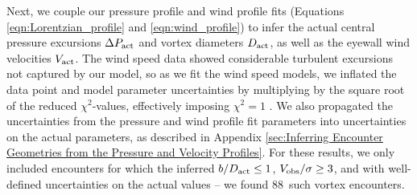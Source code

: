 \documentclass[linenumbers,trackchanges]{aastex63}
\newcommand{\boverDactltone}{88}
\begin{document}


Next, we couple our pressure profile and wind profile fits (Equations \ref{eqn:Lorentzian_profile} and \ref{eqn:wind_profile}) to infer the actual central pressure excursions $\Delta P_{\rm act}$ and vortex diameters $D_{\rm act}$, as well as the eyewall wind velocities $V_{\rm act}$. The wind speed data showed considerable turbulent excursions not captured by our model, so as we fit the wind speed models, we inflated the data point and model parameter uncertainties by multiplying by the square root of the reduced $\chi^2$-values, effectively imposing $\chi^2 = 1$ \citep[\emph{cf.}][]{Press2007}. We also propagated the uncertainties from the pressure and wind profile fit parameters into uncertainties on the actual parameters, as described in Appendix \ref{sec:Inferring Encounter Geometries from the Pressure and Velocity Profiles}. For these results, we only included encounters for which the inferred $b/D_{\rm act} \leq 1$, $V_{\rm obs}/\sigma \geq 3$, and with well-defined uncertainties on the actual values -- we found \boverDactltone\ such vortex encounters. 
\end{document}
